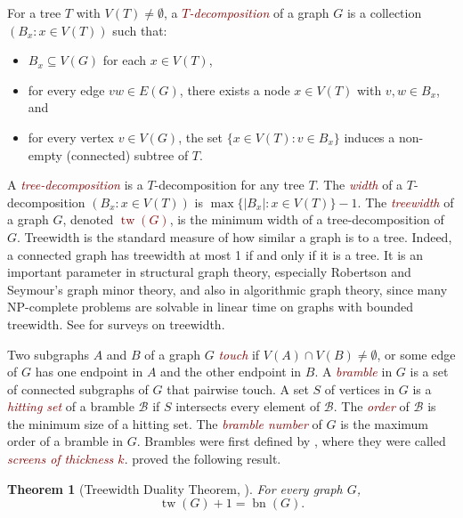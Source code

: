 \documentclass[11pt]{article}
\newcommand{\defn}[1]{\textcolor{Maroon}{\emph{#1}}}
\newcommand{\BB}{\mathcal{B}}
\DeclareMathOperator{\bn}{bn}
\DeclareMathOperator{\tw}{tw}
\DeclareMathOperator{\pw}{pw}
\theoremstyle{plain}
\newtheorem{thm}{Theorem}
\theoremstyle{definition}
\begin{document}
		For a tree $T$ with $V(T)\neq\emptyset$, a \defn{$T$-decomposition} of a graph $G$ is a collection $(B_x:x \in V(T))$ such that:
		\begin{itemize}
			\item $B_x\subseteq V(G)$ for each $x\in V(T)$, 
			\item for every edge ${vw \in E(G)}$, there exists a node ${x \in V(T)}$ with ${v,w \in B_x}$, and 
			\item for every vertex ${v \in V(G)}$, the set $\{ x \in V(T) : v \in B_x \}$ induces a non-empty (connected) subtree of $T$. 
		\end{itemize}
		A \defn{tree-decomposition} is a $T$-decomposition for any tree $T$. 
		The \defn{width} of a $T$-decomposition $(B_x:x \in V(T))$ is ${\max\{ |B_x| : x \in V(T) \}-1}$. The \defn{treewidth} of a graph $G$, denoted \defn{$\tw(G)$}, is the minimum width of a tree-decomposition of $G$. 
		Treewidth is the standard measure of how similar a graph is to a tree. Indeed, a connected graph has treewidth at most 1 if and only if it is a tree. It is an important parameter in structural graph theory, especially Robertson and Seymour's graph minor theory, and also in algorithmic graph theory, since many NP-complete problems are solvable in linear time on graphs with bounded treewidth. See \citep{HW17,Bodlaender98,Reed97} for surveys on treewidth. 
		
		Two subgraphs $A$ and $B$ of a graph $G$ \defn{touch} if $V(A)\cap V(B)\neq\emptyset$, or some edge of $G$ has one endpoint in $A$ and the other endpoint in $B$. A \defn{bramble} in $G$ is a set of connected subgraphs of $G$ that pairwise touch. A set $S$ of vertices in $G$ is a \defn{hitting set} of a bramble $\BB$ if $S$ intersects every element of $\BB$. The \defn{order} of $\BB$ is the minimum size of a hitting set. The \defn{bramble number} of $G$ is the maximum order of a bramble in $G$. Brambles were first defined by \citet{ST93}, where they were called \defn{screens of thickness $k$}. \citet{ST93} proved the following result. 
		
		\begin{thm}[Treewidth Duality Theorem, \citep{ST93}]
			\label{TreewidthDuality}
			For every graph $G$, 
			$$\tw(G)+1=\bn(G).$$ 
		\end{thm}
		
\end{document}
